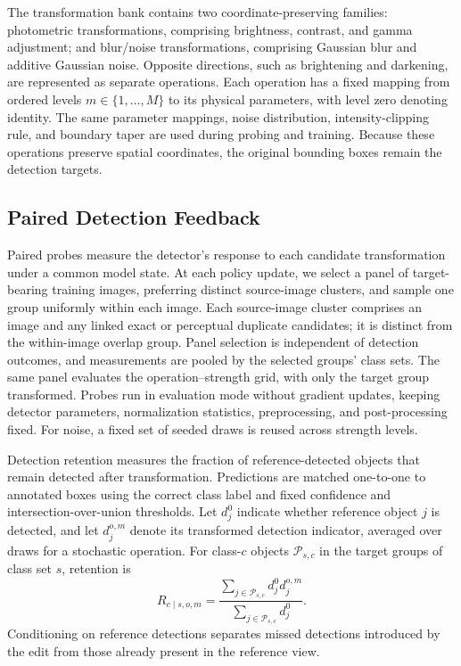 \documentclass[conference]{IEEEtran}
\begin{document}
The transformation bank contains two coordinate-preserving families: photometric transformations, comprising brightness, contrast, and gamma adjustment; and blur/noise transformations, comprising Gaussian blur and additive Gaussian noise. Opposite directions, such as brightening and darkening, are represented as separate operations. Each operation has a fixed mapping from ordered levels $m\in\{1,\ldots,M\}$ to its physical parameters, with level zero denoting identity. The same parameter mappings, noise distribution, intensity-clipping rule, and boundary taper are used during probing and training. Because these operations preserve spatial coordinates, the original bounding boxes remain the detection targets.

\subsection{Paired Detection Feedback}
\label{sec:method_feedback}
Paired probes measure the detector's response to each candidate transformation under a common model state. At each policy update, we select a panel of target-bearing training images, preferring distinct source-image clusters, and sample one group uniformly within each image. Each source-image cluster comprises an image and any linked exact or perceptual duplicate candidates; it is distinct from the within-image overlap group. Panel selection is independent of detection outcomes, and measurements are pooled by the selected groups' class sets. The same panel evaluates the operation--strength grid, with only the target group transformed. Probes run in evaluation mode without gradient updates, keeping detector parameters, normalization statistics, preprocessing, and post-processing fixed. For noise, a fixed set of seeded draws is reused across strength levels.

Detection retention measures the fraction of reference-detected objects that remain detected after transformation. Predictions are matched one-to-one to annotated boxes using the correct class label and fixed confidence and intersection-over-union thresholds. Let $d_j^0$ indicate whether reference object $j$ is detected, and let $d_j^{o,m}$ denote its transformed detection indicator, averaged over draws for a stochastic operation. For class-$c$ objects $\mathcal{P}_{s,c}$ in the target groups of class set $s$, retention is
\begin{equation}
 R_{c\mid s,o,m}=
 \frac{\sum_{j\in\mathcal{P}_{s,c}}d_j^0d_j^{o,m}}
      {\sum_{j\in\mathcal{P}_{s,c}}d_j^0}.
 \label{eq:retention}
\end{equation}
Conditioning on reference detections separates missed detections introduced by the edit from those already present in the reference view.
\end{document}
